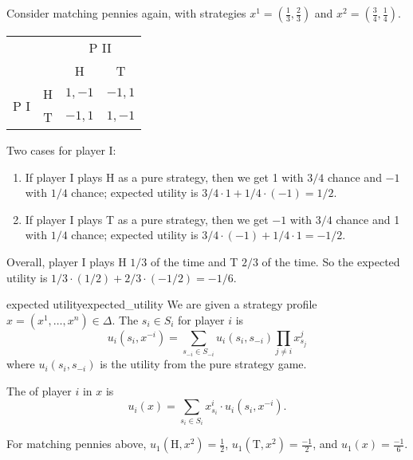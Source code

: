 \documentclass[12pt,letterpaper]{report}
\begin{document}
\begin{ex}
  Consider matching pennies again, with strategies $x^1 = (\frac{1}{3}, \frac{2}{3})$ and
  $x^2 = (\frac{3}{4}, \frac{1}{4})$.

  \begin{center}
    \renewcommand{\arraystretch}{1.2}
    \begin{tabular}{c c|c|c|}
      \multicolumn{2}{c}{} & \multicolumn{2}{c}{P II} \\
      \multicolumn{2}{c}{} & \multicolumn{1}{c}{H} & \multicolumn{1}{c}{T} \\
      \cline{3-4}
      \multirow{2}{*}{P I} & H & $1, -1$ & $-1, 1$ \\
      \cline{3-4}
      & T & $-1, 1$ & $1, -1$ \\
      \cline{3-4}
    \end{tabular}
  \end{center}

  Two cases for player I:
  \begin{enumerate}
    \item
    If player I plays H as a pure strategy, then we get 1 with $3/4$ chance and $-1$ with $1/4$
    chance; expected utility is $3/4 \cdot 1 + 1/4 \cdot (-1) = 1/2$.
    \item
    If player I plays T as a pure strategy, then we get $-1$ with $3/4$ chance and 1 with $1/4$
    chance; expected utility is $3/4 \cdot (-1) + 1/4 \cdot 1 = -1/2$.
  \end{enumerate}
  Overall, player I plays H $1/3$ of the time and T $2/3$ of the time.
  So the expected utility is $1/3 \cdot (1/2) + 2/3 \cdot (-1/2) = -1/6$.
\end{ex}

\begin{defn}{expected utility}{expected_utility}
  We are given a strategy profile $x = (x^1, \ldots, x^n) \in \Delta$.
  The  $s_i \in S_i$ for player $i$ is
  \[
    u_i(s_i, x^{-i}) = \sum_{s_{-i} \in S_{-i}} u_i(s_i, s_{-i}) \prod_{j \neq i} x_{s_j}^j
  \]
  where $u_i(s_i, s_{-i})$ is the utility from the pure strategy game.

  The  of player $i$ in $x$ is
  \[
    u_i(x) = \sum_{s_i \in S_i} x_{s_i}^i \cdot u_i(s_i, x^{-i}).
  \]
\end{defn}

\begin{ex}
  For matching pennies above, $u_1(\text{H}, x^2) = \frac{1}{2}$,
  $u_1(\text{T}, x^2) = \frac{-1}{2}$, and $u_1(x) = \frac{-1}{6}$.
\end{ex}
\end{document}
